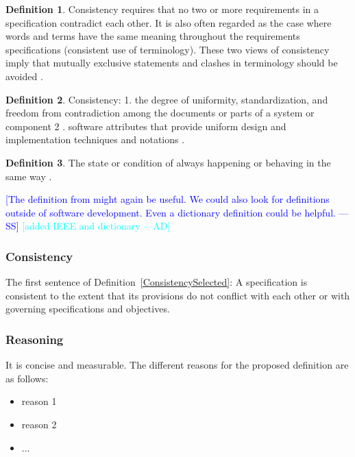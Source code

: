 \documentclass[letterpaper, cleveref]{lipics-v2019}
\newcommand{\authornote}[3]{\textcolor{#1}{[#3 ---#2]}}
\newcommand{\authornote}[3]{}
\newcommand{\wss}[1]{\authornote{blue}{SS}{#1}} %
\newcommand{\ad}[1]{\authornote{cyan}{AD}{#1}} %
\theoremstyle{definition}
\newtheorem{defn}{Definition}
\begin{document}
\begin{defn}
  Consistency requires that no two or more requirements in a specification
  contradict each other. It is also often regarded as the case where words
  and terms have the same meaning throughout the requirements specifications
  (consistent use of terminology). These two views of consistency imply that
  mutually exclusive statements and clashes in terminology should be avoided
  \citep{ZOWGHI2003}.
\end{defn}

\begin{defn}
  Consistency: 1. the degree of uniformity, standardization, and freedom
  from contradiction among the documents or parts of a system or component 2
  . software attributes that provide uniform design and implementation
  techniques and notations \citep{ISO/IEC/IEEE24765}.
\end{defn}

\begin{defn}
The state or condition of always happening or behaving in the same way
\citep{CambridgeConsistency2019}.
\end{defn}

\wss{The definition from \citet{IEEE1998} might again be useful.  We could also
  look for definitions outside of software development.  Even a dictionary
  definition could be helpful.}
\ad{added IEEE and dictionary}

\begin{mybox}
\subsubsection*{Consistency} 
The first sentence of Definition~\ref{ConsistencySelected}: A specification is
consistent to the extent that its provisions do not conflict with each other or
with governing specifications and objectives.
\end{mybox}

\subsubsection*{Reasoning}

It is concise and measurable.  The different reasons for the proposed definition
are as follows:

\begin{itemize}
  \item reason 1
  \item reason 2
  \item ...
\end{itemize}
\end{document}
